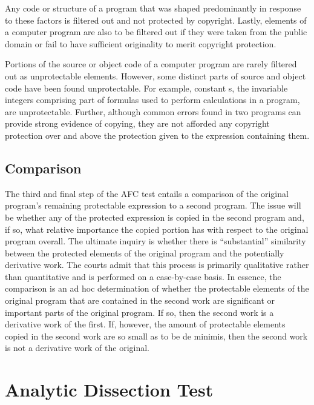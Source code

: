 Any code or structure of a program that was shaped predominantly in
response to these factors is filtered out and not protected by
copyright. Lastly, elements of a computer program are also to be filtered
out if they were taken from the public domain or fail to have sufficient
originality to merit copyright protection.

Portions of the source or object code of a computer program are rarely
filtered out as unprotectable elements. However, some distinct parts of
source and object code have been found unprotectable. For example,
constant s, the invariable integers comprising part of formulas used to
perform calculations in a program, are unprotectable. Further, although
common errors found in two programs can provide strong evidence of
copying, they are not afforded any copyright protection over and above the
protection given to the expression containing them.

\subsection{Comparison}

The third and final step of the AFC test entails a comparison of the
original program's remaining protectable expression to a second
program. The issue will be whether any of the protected expression is
copied in the second program and, if so, what relative importance the
copied portion has with respect to the original program overall. The
ultimate inquiry is whether there is ``substantial'' similarity between
the protected elements of the original program and the potentially
derivative work. The courts admit that this process is primarily
qualitative rather than quantitative and is performed on a case-by-case
basis. In essence, the comparison is an ad hoc determination of whether
the protectable elements of the original program that are contained in the
second work are significant or important parts of the original program. If
so, then the second work is a derivative work of the first. If, however,
the amount of protectable elements copied in the second work are so small
as to be de minimis, then the second work is not a derivative work of the
original.

\section{Analytic Dissection Test}

